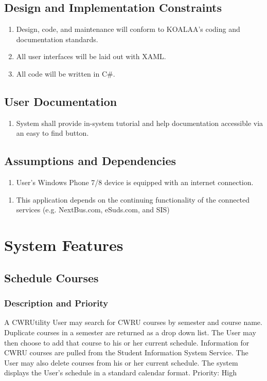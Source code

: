\documentclass[pdftex,12pt,letter]{article}
\begin{document}
\subsection{Design and Implementation Constraints}
\begin{enumerate}[CO-1:]
\item Design, code, and maintenance will conform to KOALAA's coding and documentation standards.
\item All user interfaces will be laid out with XAML.
\item All code will be written in C\#.
\end{enumerate}
\subsection{User Documentation}
\begin{enumerate}[UD-1:]
\item System shall provide in-system tutorial and help documentation accessible via an easy to find button.
\end{enumerate}
\subsection{Assumptions and Dependencies}
\begin{enumerate}[{A}S-1:]
\item User's Windows Phone 7/8 device is equipped with an internet connection.
\end{enumerate}
\begin{enumerate}[DE-1:]
\item This application depends on the continuing functionality of the connected services (e.g. NextBus.com, eSuds.com, and SIS)
\end{enumerate}
\section{System Features}
\subsection{Schedule Courses}
\subsubsection{Description and Priority}
A CWRUtility User may search for CWRU courses by semester and course name. Duplicate courses in a semester are returned as a drop down list. The User may then choose to add that course to his or her current schedule. Information for CWRU courses are pulled from the Student Information System Service. The User may also delete courses from his or her current schedule. The system displays the User's schedule in a standard calendar format. Priority: High
\end{document}
